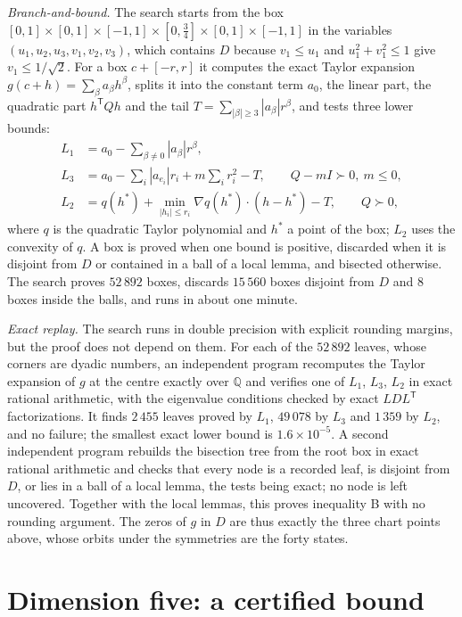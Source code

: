 \documentclass[11pt,a4paper]{article}
\theoremstyle{plain}
\newcommand{\Q}{\mathbb Q}
\begin{document}
\emph{Branch-and-bound.} The search starts from the box
$[0,1]\times[0,1]\times[-1,1]\times[0,\tfrac34]\times[0,1]\times[-1,1]$ in the
variables $(u_1,u_2,u_3,v_1,v_2,v_3)$, which contains $D$ because $v_1\le u_1$
and $u_1^2+v_1^2\le1$ give $v_1\le1/\sqrt2$. For a box $c+[-r,r]$ it computes the
exact Taylor expansion $g(c+h)=\sum_\beta a_\beta h^\beta$, splits it into the
constant term $a_0$, the linear part, the quadratic part $h^{\mathsf T}Qh$ and
the tail $T=\sum_{|\beta|\ge3}|a_\beta|r^\beta$, and tests three lower bounds:
\begin{align}
  L_1&=a_0-\sum_{\beta\ne0}|a_\beta|r^\beta,\\
  L_3&=a_0-\sum_i|a_{e_i}|r_i+m\sum_ir_i^2-T,\qquad Q-mI\succ0,\ m\le0,\\
  L_2&=q(h^*)+\min_{|h_i|\le r_i}\nabla q(h^*)\cdot(h-h^*)-T,\qquad Q\succ0,
\end{align}
where $q$ is the quadratic Taylor polynomial and $h^*$ a point of the box; $L_2$
uses the convexity of $q$. A box is proved when one bound is positive,
discarded when it is disjoint from $D$ or contained in a ball of a local lemma,
and bisected otherwise. The search proves $52\,892$ boxes, discards $15\,560$
boxes disjoint from $D$ and $8$ boxes inside the balls, and runs in about one
minute.

\emph{Exact replay.} The search runs in double precision with explicit
rounding margins, but the proof does not depend on them. For each of the
$52\,892$ leaves, whose corners are dyadic numbers, an independent program
recomputes the Taylor expansion of $g$ at the centre exactly over $\Q$ and
verifies one of $L_1$, $L_3$, $L_2$ in exact rational arithmetic, with the
eigenvalue conditions checked by exact $LDL^{\mathsf T}$ factorizations. It
finds $2\,455$ leaves proved by $L_1$, $49\,078$ by $L_3$ and $1\,359$ by $L_2$,
and no failure; the smallest exact lower bound is $1.6\times10^{-5}$. A second
independent program rebuilds the bisection tree from the root box in exact
rational arithmetic and checks that every node is a recorded leaf, is disjoint
from $D$, or lies in a ball of a local lemma, the tests being exact; no node is
left uncovered. Together with the local lemmas, this proves inequality B with
no rounding argument. The zeros of $g$ in $D$ are thus exactly the three chart
points above, whose orbits under the symmetries are the forty states.

\section{Dimension five: a certified bound}\label{sec:d5}
\end{document}
